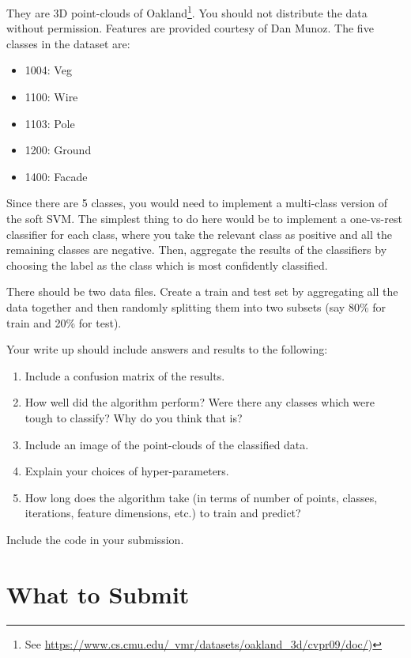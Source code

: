 \documentclass{article}
\begin{document}
They are 3D point-clouds of Oakland\footnote{See \href{https://www.cs.cmu.edu/~vmr/datasets/oakland_3d/cvpr09/doc/}{https://www.cs.cmu.edu/~vmr/datasets/oakland\_3d/cvpr09/doc/})}.
You should not distribute the data without permission.
Features are provided courtesy of Dan Munoz.
The five classes in the dataset are:

\begin{itemize}
\item 1004: Veg
\item 1100: Wire
\item 1103: Pole
\item 1200: Ground
\item 1400: Facade
\end{itemize}

Since there are 5 classes, you would need to implement a multi-class version of the soft SVM.
The simplest thing to do here would be to implement a one-vs-rest classifier for each class, where you take the relevant class as positive and all the remaining classes are negative.
Then, aggregate the results of the classifiers by choosing the label as the class which is most confidently classified.

There should be two data files.
Create a train and test set by aggregating all the data together and then randomly splitting them into two subsets (say 80\% for train and 20\% for test).

Your write up should include answers and results to the following:
\begin{enumerate}
  \item Include a confusion matrix of the results.
  \item How well did the algorithm perform? Were there any classes which were tough to classify? Why do you think that is?
  \item Include an image of the point-clouds of the classified data.
  \item Explain your choices of hyper-parameters.
  \item How long does the algorithm take (in terms of number of points, classes, iterations, feature dimensions, etc.) to train and predict?
\end{enumerate}

Include the code in your submission. 


\section{What to Submit}\label{sec:wts}
\end{document}
